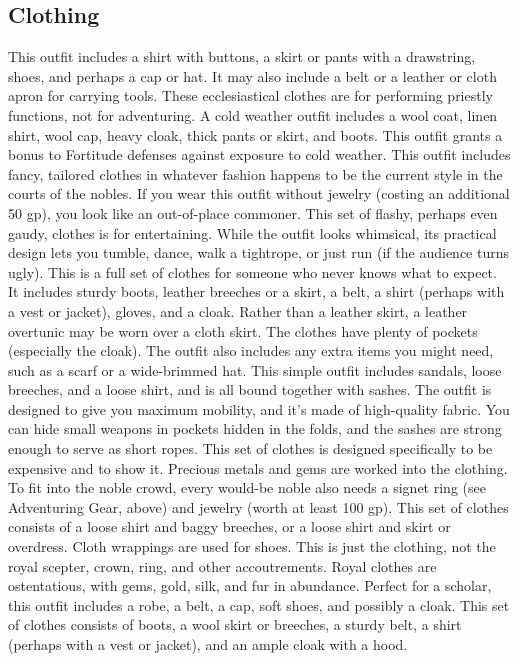 \subsection{Clothing}
 This outfit includes a shirt with buttons, a skirt or pants with a drawstring, shoes, and perhaps a cap or hat. It may also include a belt or a leather or cloth apron for carrying tools.
 These ecclesiastical clothes are for performing priestly functions, not for adventuring.
 A cold weather outfit includes a wool coat, linen shirt, wool cap, heavy cloak, thick pants or skirt, and
boots. This outfit grants a  bonus to Fortitude defenses against exposure to cold weather.
 This outfit includes fancy, tailored clothes in whatever fashion happens to be the current style in the courts of the nobles. If you wear this outfit without jewelry (costing an additional 50 gp), you look like an out-of-place commoner.
 This set of flashy, perhaps even gaudy, clothes is for entertaining. While the outfit looks whimsical, its practical design lets you tumble, dance, walk a tightrope, or just run (if the audience turns ugly).
 This is a full set of clothes for someone who never knows what to expect. It includes sturdy boots, leather breeches or a skirt, a belt, a shirt (perhaps with a vest or jacket), gloves, and a cloak. Rather than a leather skirt, a leather overtunic may be worn over a cloth skirt. The clothes have plenty of pockets (especially the cloak). The outfit also includes any extra items you might need, such as a scarf or a wide-brimmed hat.
 This simple outfit includes sandals, loose breeches, and a loose shirt, and is all bound together with sashes. The outfit is designed to give you maximum mobility, and it's made of high-quality fabric. You can hide small weapons in pockets hidden in the folds, and the sashes are strong enough to serve as short ropes.
 This set of clothes is designed specifically to be expensive and to show it. Precious metals and gems are worked into the clothing. To fit into the noble crowd, every would-be noble also needs a signet ring (see Adventuring Gear, above) and jewelry (worth at least 100 gp).
 This set of clothes consists of a loose shirt and baggy breeches, or a loose shirt and skirt or overdress. Cloth wrappings are used for shoes.
 This is just the clothing, not the royal scepter, crown, ring, and other accoutrements. Royal clothes are ostentatious, with gems, gold, silk, and fur in abundance.
 Perfect for a scholar, this outfit includes a robe, a belt, a cap, soft shoes, and possibly a cloak.
 This set of clothes consists of boots, a wool skirt or breeches, a sturdy belt, a shirt (perhaps with a vest or jacket), and an ample cloak with a hood.

